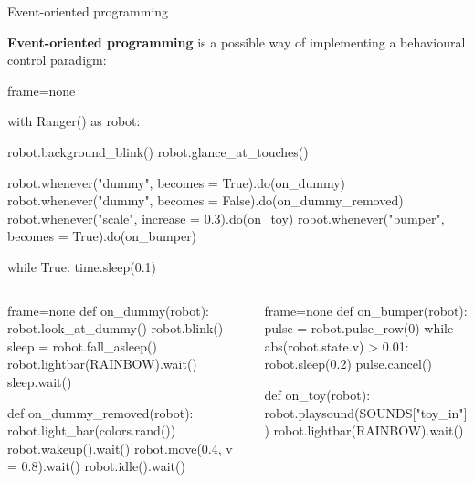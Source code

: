 \documentclass[compress]{beamer}
\begin{document}
\begin{frame}[fragile]{Event-oriented programming}

    {\bf Event-oriented programming} is a possible way of implementing a
    behavioural control paradigm:
    \vspace{1em}

\begin{overprint}
\begin{pythoncode*}{frame=none}

with Ranger() as robot:

  robot.background_blink()
  robot.glance_at_touches()

  robot.whenever("dummy", becomes = True).do(on_dummy)
  robot.whenever("dummy", becomes = False).do(on_dummy_removed)
  robot.whenever("scale", increase = 0.3).do(on_toy)
  robot.whenever("bumper", becomes = True).do(on_bumper)

  while True:
      time.sleep(0.1)
\end{pythoncode*}

    
    
    \begin{columns}
        \begin{column}{0.45\linewidth}
            \begin{pythoncode*}{frame=none}
def on_dummy(robot):
    robot.look_at_dummy()
    robot.blink()
    sleep = robot.fall_asleep()
    robot.lightbar(RAINBOW).wait()
    sleep.wait()

def on_dummy_removed(robot):
    robot.light_bar(colors.rand())
    robot.wakeup().wait()
    robot.move(0.4, v = 0.8).wait()
    robot.idle().wait()

\end{pythoncode*}
\end{column}
        \begin{column}{0.55\linewidth}
\begin{pythoncode*}{frame=none}
def on_bumper(robot):
    pulse = robot.pulse_row(0)
    while abs(robot.state.v) > 0.01:
        robot.sleep(0.2)
    pulse.cancel()

def on_toy(robot):
    robot.playsound(SOUNDS["toy_in"])
    robot.lightbar(RAINBOW).wait()
\end{pythoncode*}
        \end{column}
    \end{columns}
\end{overprint}
\end{frame}
\end{document}
